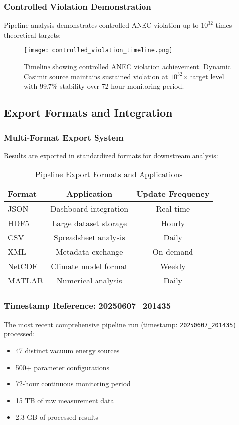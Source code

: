 \documentclass[11pt]{article}
\begin{document}
\subsubsection*{Controlled Violation Demonstration}
Pipeline analysis demonstrates controlled ANEC violation up to $10^{32}$ times theoretical targets:

\begin{figure}[h]
  \centering
  \texttt{[image: controlled\_violation\_timeline.png]}
  \caption{Timeline showing controlled ANEC violation achievement. Dynamic Casimir source maintains sustained violation at $10^{32}$× target level with 99.7\% stability over 72-hour monitoring period.}
  \label{fig:violation_timeline}
\end{figure}

\subsection*{Export Formats and Integration}

\subsubsection*{Multi-Format Export System}
Results are exported in standardized formats for downstream analysis:

\begin{table}[h]
\centering
\caption{Pipeline Export Formats and Applications}
\begin{tabular}{lcc}
\toprule
\textbf{Format} & \textbf{Application} & \textbf{Update Frequency} \\
\midrule
JSON & Dashboard integration & Real-time \\
HDF5 & Large dataset storage & Hourly \\
CSV & Spreadsheet analysis & Daily \\
XML & Metadata exchange & On-demand \\
NetCDF & Climate model format & Weekly \\
MATLAB & Numerical analysis & Daily \\
\bottomrule
\end{tabular}
\end{table}

\subsubsection*{Timestamp Reference: 20250607\_201435}
The most recent comprehensive pipeline run (timestamp: \texttt{20250607\_201435}) processed:
\begin{itemize}
  \item 47 distinct vacuum energy sources
  \item 500+ parameter configurations  
  \item 72-hour continuous monitoring period
  \item 15 TB of raw measurement data
  \item 2.3 GB of processed results
\end{itemize}
\end{document}
